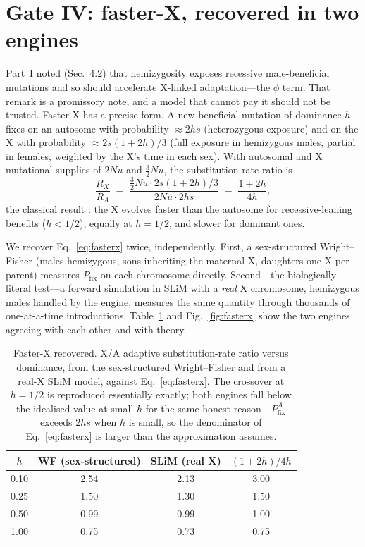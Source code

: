 \documentclass[11pt,a4paper]{article}
\newcommand{\Pfix}{P_{\mathrm{fix}}}
\begin{document}
\section{Gate IV: faster-X, recovered in two engines}
\label{sec:fasterx}

Part~I noted (Sec.~4.2) that hemizygosity exposes recessive male-beneficial mutations and so should accelerate X-linked adaptation---the $\phi$ term. That remark is a promissory note, and a model that cannot pay it should not be trusted. Faster-X has a precise form. A new beneficial mutation of dominance $h$ fixes on an autosome with probability $\approx 2hs$ (heterozygous exposure) and on the X with probability $\approx 2s(1{+}2h)/3$ (full exposure in hemizygous males, partial in females, weighted by the X's time in each sex). With autosomal and X mutational supplies of $2Nu$ and $\tfrac{3}{2}Nu$, the substitution-rate ratio is
\begin{equation}
\frac{R_X}{R_A}\;=\;\frac{\tfrac{3}{2}Nu\cdot 2s(1{+}2h)/3}{2Nu\cdot 2hs}\;=\;\frac{1+2h}{4h},
\label{eq:fasterx}
\end{equation}
the classical result \citep{ccb1987}: the X evolves faster than the autosome for recessive-leaning benefits ($h<1/2$), equally at $h=1/2$, and slower for dominant ones.

We recover Eq.~\eqref{eq:fasterx} twice, independently. First, a sex-structured Wright--Fisher (males hemizygous, sons inheriting the maternal X, daughters one X per parent) measures $\Pfix$ on each chromosome directly. Second---the biologically literal test---a forward simulation in SLiM \citep{haller2019} with a \emph{real} X chromosome, hemizygous males handled by the engine, measures the same quantity through thousands of one-at-a-time introductions. Table~\ref{tab:fasterx} and Fig.~\ref{fig:fasterx} show the two engines agreeing with each other and with theory.

\begin{table}[h!]
\centering\small
\caption{Faster-X recovered. X/A adaptive substitution-rate ratio versus dominance, from the sex-structured Wright--Fisher and from a real-X SLiM model, against Eq.~\eqref{eq:fasterx}. The crossover at $h=1/2$ is reproduced essentially exactly; both engines fall below the idealised value at small $h$ for the same honest reason---$\Pfix^A$ exceeds $2hs$ when $h$ is small, so the denominator of Eq.~\eqref{eq:fasterx} is larger than the approximation assumes.}
\label{tab:fasterx}
\begin{tabular}{c c c c}
\toprule
$h$ & WF (sex-structured) & SLiM (real X) & $(1{+}2h)/4h$ \\
\midrule
0.10 & 2.54 & 2.13 & 3.00 \\
0.25 & 1.50 & 1.30 & 1.50 \\
0.50 & 0.99 & 0.99 & 1.00 \\
1.00 & 0.75 & 0.73 & 0.75 \\
\bottomrule
\end{tabular}
\end{table}
\end{document}

